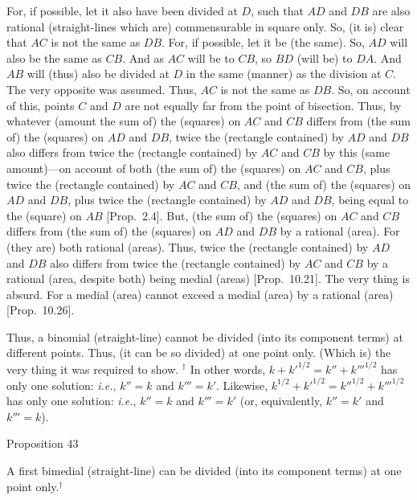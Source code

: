 For, if possible, let it also have been divided at $D$, such that $AD$ and
$DB$ are also rational (straight-lines which are) commensurable in
square only. So, (it is) clear that $AC$ is not the same as $DB$.
For, if possible, let it be (the same). So, $AD$ will also be the same
as $CB$. And as $AC$ will be to $CB$, so $BD$ (will be) to $DA$.
And $AB$ will (thus) also be divided at $D$ in the same (manner) as the division at $C$. The very opposite was assumed. Thus, $AC$ is not the
same as $DB$. So, on account of this,  points $C$ and $D$ are
not equally far from the point of bisection. Thus, by whatever (amount the sum of) the (squares) on $AC$ and $CB$ differs from (the sum of) the
(squares) on $AD$ and $DB$, twice the (rectangle contained)
by $AD$ and $DB$ also differs from twice the (rectangle contained)
by $AC$ and $CB$ by this (same amount)---on account of both (the sum of) the (squares) on $AC$ and
$CB$, plus twice the (rectangle contained) by $AC$ and $CB$, and
(the sum of) the (squares) on $AD$ and $DB$, plus twice the
(rectangle contained) by $AD$ and $DB$,  being equal to the (square) on $AB$ [Prop.~2.4]. But, (the sum of) the
(squares) on  $AC$ and $CB$ differs from (the sum of) the (squares)
on $AD$ and $DB$ by a rational (area). For (they are) both rational (areas).
Thus, twice the (rectangle contained) by $AD$ and $DB$ also differs from
twice the (rectangle contained) by $AC$ and $CB$ by a
rational (area, despite both) being medial (areas) [Prop.~10.21]. The very thing is absurd. For a
medial (area) cannot exceed a medial (area) by a rational (area) [Prop.~10.26].

Thus, a binomial (straight-line) cannot be divided (into its component terms) at different points.
Thus, (it can be so divided) at one point only. (Which is) the very thing it
was required to show.
{\footnotesize\noindent$^\dag$ In other words, $k + k'^{1/2} = k'' + k'''^{1/2}$
has only one solution: {\em i.e.}, $k''=k$ and $k'''=k'$. Likewise,
$k^{1/2} + k'^{1/2} = k''^{1/2}+ k'''^{1/2}$ has only one solution:
{\em i.e.}, $k''=k$ and $k'''=k'$ (or, equivalently, $k''=k'$ and $k'''=k$).}


\begin{center}
{\large Proposition 43}
\end{center}

A first bimedial (straight-line) can be divided (into its component terms) at
one point only.$^\dag$

